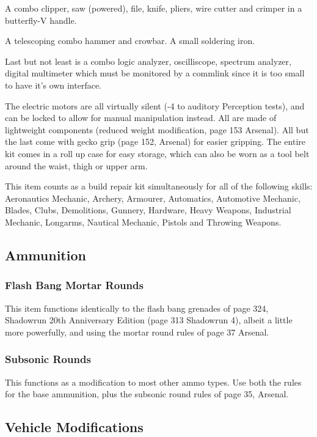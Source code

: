 \documentclass{article}
\begin{document}
  A combo clipper, saw (powered), file, knife, pliers, wire cutter and crimper in a butterfly-V handle.
  
  A telescoping combo hammer and crowbar.  A small soldering iron.  
  
  Last but not least is a combo logic analyzer, oscilliscope, spectrum analyzer, digital multimeter which must be monitored by a commlink since it is too small to have it's own interface.

  The electric motors are all virtually silent (-4 to auditory Perception tests), and can be locked to allow for manual manipulation instead.  All are made of lightweight components (reduced weight modification, page 153 Arsenal).  All but the last come with gecko grip (page 152, Arsenal) for easier gripping.  The entire kit comes in a roll up case for easy storage, which can also be worn as a tool belt around the waist, thigh or upper arm.

  This item counts as a build repair kit simultaneously for all of the following skills:  Aeronautics Mechanic, Archery, Armourer, Automatics, Automotive Mechanic, Blades, Clubs, Demolitions, Gunnery, Hardware, Heavy Weapons, Industrial Mechanic, Longarms, Nautical Mechanic, Pistols and Throwing Weapons.

\subsection*{Ammunition}

\subsubsection*{Flash Bang Mortar Rounds}

 This item functions identically to the flash bang grenades of page 324, Shadowrun 20th Anniversary Edition (page 313 Shadowrun 4), albeit a little more powerfully, and using the mortar round rules of page 37 Arsenal. 

\subsubsection*{Subsonic Rounds}

  This functions as a modification to most other ammo types.  Use both the rules for the base ammunition, plus the subsonic round rules of page 35, Arsenal.

\subsection*{Vehicle Modifications}
\end{document}
